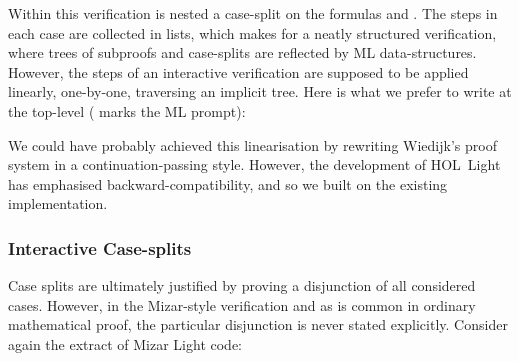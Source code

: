 Within this verification is nested a case-split on the formulas  and \linebreak{}. The steps in each case are collected in lists, which makes for a neatly structured verification, where trees of subproofs and case-splits are reflected by ML data-structures. However, the steps of an interactive verification are supposed to be applied linearly, one-by-one, traversing an implicit tree. Here is what we prefer to write at the top-level (\code{>} marks the ML prompt):

\vspace{0.5cm}
\begin{minipage}{\linewidth}
  \footnotesize







\end{minipage}
\vspace{0.5cm}

We could have probably achieved this linearisation by rewriting Wiedijk's proof system in a continuation-passing style. However, the development of HOL~Light has emphasised backward-compatibility, and so we built on the existing implementation.

\subsubsection{Interactive Case-splits}
Case splits are ultimately justified by proving a disjunction of all considered cases. However, in the Mizar-style verification and as is common in ordinary mathematical proof, the particular disjunction is never stated explicitly. Consider again the extract of Mizar Light code:

\vspace{0.5cm}
\begin{minipage}{\linewidth}
  \footnotesize

  \code{\quad\enspace[[suppose "p1 = p2";}

  \code{\qquad\enspace qed from [0] by [LEMMA1]];}

  \code{\qquad [suppose "$\neg$(p1 = p2)";}

  \code{\qquad\enspace qed from [1]]]];}
\end{minipage}
\vspace{0.5cm}

